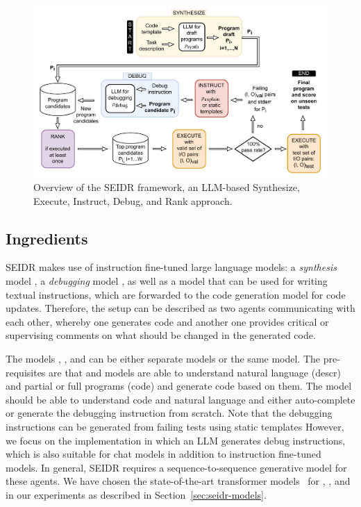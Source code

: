 \begin{figure}[H]
    \centering
    \includegraphics[width=\linewidth,trim={0mm 0mm 0mm 0mm}]{images/codex-for-psb-seidr-methodology-5.drawio.pdf}
    \caption{Overview of the SEIDR framework, an LLM-based Synthesize, Execute, Instruct, Debug, and Rank approach.}
    \label{fig:method}
\end{figure}
 

\newpage \subsection{Ingredients}
\label{sec:seidr-ingredients}

SEIDR makes use of instruction fine-tuned large language models: a \emph{synthesis} model \synthmodel{}, a \emph{debugging} model \debugmodel{}, as well as a model \textmodel{} that can be used for writing textual instructions, which are forwarded to the code generation model \debugmodel{} for code updates. 
Therefore, the setup can be described as two agents communicating with each other, whereby one generates code and another one provides critical or supervising comments on what should be changed in the generated code. 

The models \synthmodel{}, \debugmodel{}, and \textmodel{} can be either separate models or the same model.
The pre-requisites are that \synthmodel{} and \debugmodel{} models are able to understand natural language (descr) and partial or full programs (code) and generate code based on them. 
The model \textmodel{} should be able to understand code and natural language and either auto-complete or generate the debugging instruction from scratch. 
Note that the debugging instructions can be generated from failing tests using static templates 
However, we focus on the implementation in which an LLM generates debug instructions, which is also suitable for chat models in addition to instruction fine-tuned models. 
In general, SEIDR requires a sequence-to-sequence generative model for these agents. 
We have chosen the state-of-the-art transformer models~\cite{vaswaniAttentionAllYou2023} for \synthmodel{}, \debugmodel{}, and \textmodel{} in our experiments as described in Section~\ref{sec:seidr-models}. 

